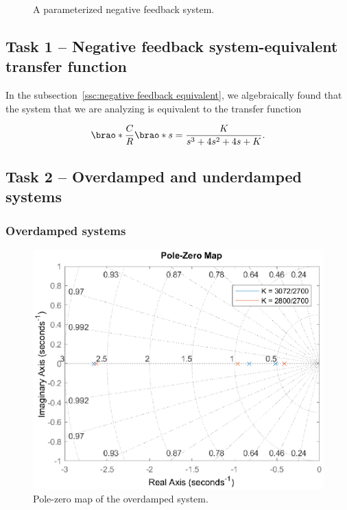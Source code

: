 \documentclass[12pt]{article}
\DeclarePairedDelimiter\brao()%
\begin{document}
\begin{figure}
    \centering
    \caption{A parameterized negative feedback system.}
    \label{fig:negative feed back system}
\end{figure}



\subsection{Task 1 -- Negative feedback system-equivalent transfer function}

In the  subsection~\ref{ssc:negative feedback equivalent}, we algebraically found that the system that we are analyzing is equivalent to the transfer function

\begin{equation}
    \brao*{\frac{C}{R}}\brao*s = \frac{K}{s^3 + 4s^2 + 4s + K}.
\end{equation}

\subsection{Task 2 -- Overdamped and underdamped systems}

\subsubsection{Overdamped systems}\label{sss:overdamped results}

\begin{figure}
    \centering
    \includegraphics[width=\linewidth]{img/task02_01_overdamped_pzmap.eps}
    \caption{Pole-zero map of the overdamped system.}
    \label{fig:overdamped pzmap}
\end{figure}
\end{document}
